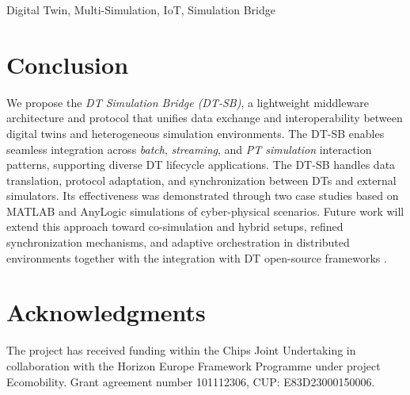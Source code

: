 \documentclass[conference]{IEEEtran}
\begin{document}
\begin{IEEEkeywords}
Digital Twin, Multi-Simulation, IoT, Simulation Bridge
\end{IEEEkeywords}









\section{Conclusion}
\label{sec:conclusion}

We propose the \emph{DT Simulation Bridge (DT-SB)}, a lightweight middleware architecture and protocol that unifies data exchange and interoperability between digital twins and heterogeneous simulation environments. The DT-SB enables seamless integration across \emph{batch}, \emph{streaming}, and \emph{PT simulation} interaction patterns, supporting diverse DT lifecycle applications. The DT-SB handles data translation, protocol adaptation, and synchronization between DTs and external simulators. Its effectiveness was demonstrated through two case studies based on MATLAB and AnyLogic simulations of cyber-physical scenarios. Future work will extend this approach toward co-simulation and hybrid setups, refined synchronization mechanisms, and adaptive orchestration in distributed environments together with the integration with DT open-source frameworks \cite{PICONE2021100661}.

\section*{Acknowledgments}
\small{The project has received funding within the Chips Joint Undertaking in collaboration with the Horizon Europe Framework Programme under project Ecomobility. Grant agreement number 101112306, CUP: E83D23000150006.}




\end{document}
